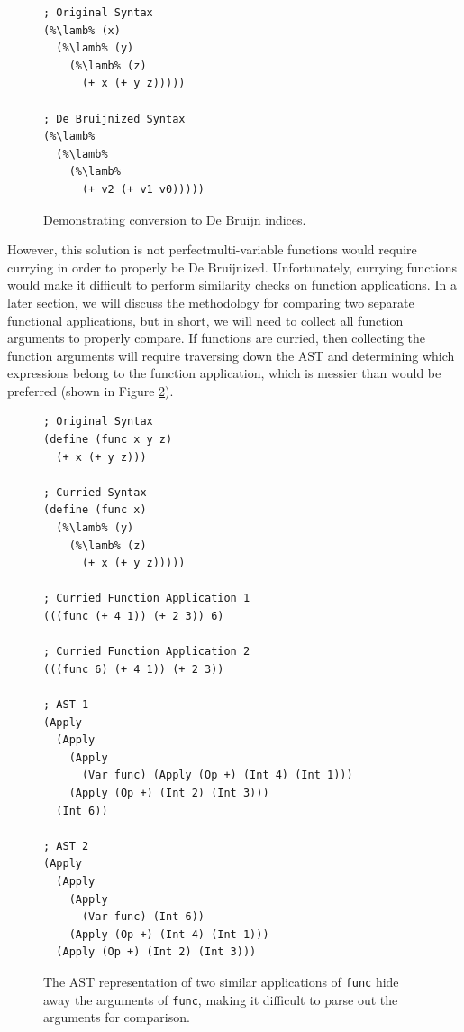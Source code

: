 \documentclass[12pt]{article}
\newcommand{\key}[1]{\texttt{#1}}
\newcommand{\lamb}[0]{\key{$\lambda$}}
\begin{document}
\begin{figure}[H]
  \begin{mdframed}
    \begin{lstlisting}[escapechar=\%]
; Original Syntax
(%\lamb% (x)
  (%\lamb% (y)
    (%\lamb% (z)
      (+ x (+ y z)))))

; De Bruijnized Syntax
(%\lamb%
  (%\lamb% 
    (%\lamb% 
      (+ v2 (+ v1 v0)))))
    \end{lstlisting}
  \end{mdframed}
  \caption{Demonstrating conversion to De Bruijn indices.}
  \label{debruijn}
\end{figure}

However, this solution is not perfect\textemdash multi-variable functions would require currying in order to properly be De Bruijnized. Unfortunately, currying functions would make it difficult to perform similarity checks on function applications. In a later section, we will discuss the methodology for comparing two separate functional applications, but in short, we will need to collect all function arguments to properly compare. If functions are curried, then collecting the function arguments will require traversing down the AST and determining which expressions belong to the function application, which is messier than would be preferred (shown in Figure \ref{curried-ast}).

\hfill

\begin{figure}[H]
  \begin{mdframed}
    \begin{lstlisting}[escapechar=\%]
; Original Syntax
(define (func x y z)
  (+ x (+ y z)))

; Curried Syntax
(define (func x)
  (%\lamb% (y)
    (%\lamb% (z)
      (+ x (+ y z)))))

; Curried Function Application 1
(((func (+ 4 1)) (+ 2 3)) 6)

; Curried Function Application 2
(((func 6) (+ 4 1)) (+ 2 3))

; AST 1
(Apply
  (Apply
    (Apply
      (Var func) (Apply (Op +) (Int 4) (Int 1)))
    (Apply (Op +) (Int 2) (Int 3)))
  (Int 6))

; AST 2
(Apply
  (Apply
    (Apply
      (Var func) (Int 6))
    (Apply (Op +) (Int 4) (Int 1)))
  (Apply (Op +) (Int 2) (Int 3)))
    \end{lstlisting}
  \end{mdframed}
  \caption{The AST representation of two similar applications of \key{func} hide away the arguments of \key{func}, making it difficult to parse out the arguments for comparison.}
  \label{curried-ast}
\end{figure}
\end{document}
